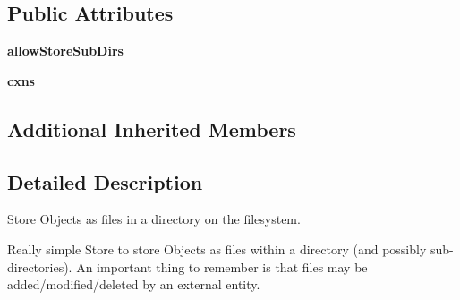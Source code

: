 \subsection*{Public Attributes}
\begin{DoxyCompactItemize}
\item 
\hypertarget{classcheshire3_1_1base_store_1_1_directory_store_ad53449d0f51daac2496e3d426c8439b4}{{\bfseries allow\-Store\-Sub\-Dirs}}\label{classcheshire3_1_1base_store_1_1_directory_store_ad53449d0f51daac2496e3d426c8439b4}

\item 
\hypertarget{classcheshire3_1_1base_store_1_1_directory_store_a5efff8480a8cdf45770156454cebcbdf}{{\bfseries cxns}}\label{classcheshire3_1_1base_store_1_1_directory_store_a5efff8480a8cdf45770156454cebcbdf}

\end{DoxyCompactItemize}
\subsection*{Additional Inherited Members}


\subsection{Detailed Description}
\begin{DoxyVerb}Store Objects as files in a directory on the filesystem.

Really simple Store to store Objects as files within a directory (and
possibly sub-directories). An important thing to remember is that
files may be added/modified/deleted by an external entity.
\end{DoxyVerb}
 


